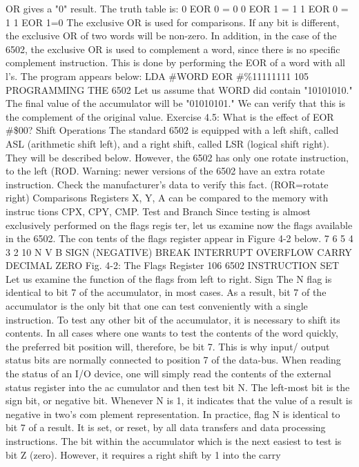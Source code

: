 \documentclass{book}
\begin{document}
OR gives a "0" result. The truth table is:
0 EOR 0 = 0
0 EOR 1 = 1
1 EOR 0 = 1
1 EOR 1=0
The exclusive OR is used for comparisons. If any bit is different,
the exclusive OR of two words will be non-zero. In addition, in the
case of the 6502, the exclusive OR is used to complement a word,
since there is no specific complement instruction. This is done by
performing the EOR of a word with all l's. The program appears
below:
LDA #WORD
EOR #\%11111111
105
PROGRAMMING THE 6502
Let us assume that WORD did contain "10101010." The final
value of the accumulator will be "01010101." We can verify that
this is the complement of the original value.
Exercise 4.5: What is the effect of EOR #\$00?
Shift Operations
The standard 6502 is equipped with a left shift, called ASL
(arithmetic shift left), and a right shift, called LSR (logical shift
right). They will be described below.
However, the 6502 has only one rotate instruction, to the left
(ROD.
Warning: newer versions of the 6502 have an extra rotate instruction.
Check the manufacturer's data to verify this fact. (ROR=rotate right)
Comparisons
Registers X, Y, A can be compared to the memory with instruc
tions CPX, CPY, CMP.
Test and Branch
Since testing is almost exclusively performed on the flags regis
ter, let us examine now the flags available in the 6502. The con
tents of the flags register appear in Figure 4-2 below.
7 6 5 4 3 2 10
N V B
SIGN
(NEGATIVE)
BREAK INTERRUPT
OVERFLOW
CARRY
DECIMAL ZERO
Fig. 4-2: The Flags Register
106
6502 INSTRUCTION SET
Let us examine the function of the flags from left to right.
Sign
The N flag is identical to bit 7 of the accumulator, in most cases.
As a result, bit 7 of the accumulator is the only bit that one can
test conveniently with a single instruction. To test any other bit of
the accumulator, it is necessary to shift its contents. In all cases
where one wants to test the contents of the word quickly, the
preferred bit position will, therefore, be bit 7. This is why input/
output status bits are normally connected to position 7 of the
data-bus. When reading the status of an I/O device, one will simply
read the contents of the external status register into the ac
cumulator and then test bit N.
The left-most bit is the sign bit, or negative bit. Whenever N is
1, it indicates that the value of a result is negative in two's com
plement representation. In practice, flag N is identical to bit 7 of a
result. It is set, or reset, by all data transfers and data processing
instructions.
The bit within the accumulator which is the next easiest to test
is bit Z (zero). However, it requires a right shift by 1 into the carry
\end{document}
